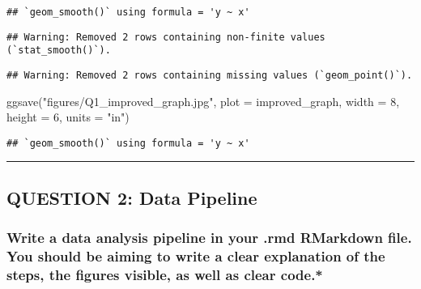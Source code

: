 \documentclass[
]{article}
\newenvironment{Shaded}{\begin{snugshade}}{\end{snugshade}}
\newcommand{\AttributeTok}[1]{\textcolor[rgb]{0.77,0.63,0.00}{#1}}
\newcommand{\DecValTok}[1]{\textcolor[rgb]{0.00,0.00,0.81}{#1}}
\newcommand{\FunctionTok}[1]{\textcolor[rgb]{0.00,0.00,0.00}{#1}}
\newcommand{\NormalTok}[1]{#1}
\newcommand{\StringTok}[1]{\textcolor[rgb]{0.31,0.60,0.02}{#1}}
\begin{document}
\begin{verbatim}
## `geom_smooth()` using formula = 'y ~ x'
\end{verbatim}

\begin{verbatim}
## Warning: Removed 2 rows containing non-finite values (`stat_smooth()`).
\end{verbatim}

\begin{verbatim}
## Warning: Removed 2 rows containing missing values (`geom_point()`).
\end{verbatim}

\begin{Shaded}
\begin{Highlighting}[]
\FunctionTok{ggsave}\NormalTok{(}\StringTok{"figures/Q1\_improved\_graph.jpg"}\NormalTok{, }\AttributeTok{plot =}\NormalTok{ improved\_graph, }\AttributeTok{width =} \DecValTok{8}\NormalTok{, }\AttributeTok{height =} \DecValTok{6}\NormalTok{, }\AttributeTok{units =} \StringTok{"in"}\NormalTok{)}
\end{Highlighting}
\end{Shaded}

\begin{verbatim}
## `geom_smooth()` using formula = 'y ~ x'
\end{verbatim}

\begin{center}\rule{0.5\linewidth}{0.5pt}\end{center}

\hypertarget{question-2-data-pipeline}{%
\subsection{QUESTION 2: Data Pipeline}\label{question-2-data-pipeline}}

\hypertarget{write-a-data-analysis-pipeline-in-your-.rmd-rmarkdown-file.-you-should-be-aiming-to-write-a-clear-explanation-of-the-steps-the-figures-visible-as-well-as-clear-code.}{%
\subsubsection{Write a data analysis pipeline in your .rmd RMarkdown
file. You should be aiming to write a clear explanation of the steps,
the figures visible, as well as clear
code.*}\label{write-a-data-analysis-pipeline-in-your-.rmd-rmarkdown-file.-you-should-be-aiming-to-write-a-clear-explanation-of-the-steps-the-figures-visible-as-well-as-clear-code.}}
\end{document}
